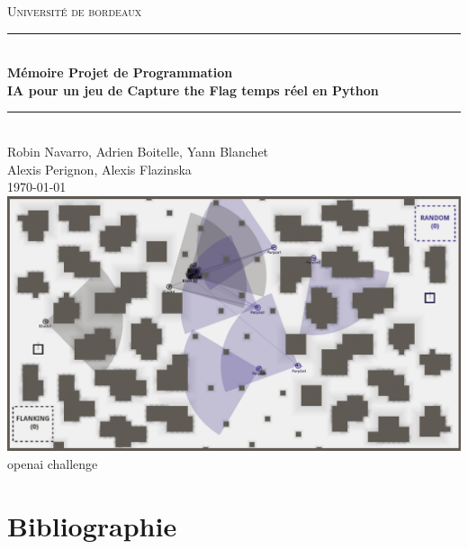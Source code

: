 \documentclass[french]{article}
\begin{document}
\begin{titlepage}
\newcommand{\HRule}{\rule{\linewidth}{0.5mm}}
\center
\textsc{\LARGE
Université de bordeaux
} \\[1cm]

\HRule \\[0.2cm]
{ \huge \bfseries Mémoire Projet de Programmation \\[0.15cm] }
{ \bfseries IA pour un jeu de Capture the Flag temps réel en Python\\[0.15cm] }
\HRule \\[1.5cm]
Robin Navarro, Adrien Boitelle, Yann Blanchet\\Alexis Perignon, Alexis Flazinska
\\[1cm]
\today \\ [3cm]
\includegraphics[scale=0.3]{data/illustration.png}{\\openai challenge}
\end{titlepage}


\newpage

\tableofcontents

\newpage

\newpage

\newpage


\newpage



\section{Bibliographie}
\printbibliography[heading=none]
\nocite{*}
\end{document}
